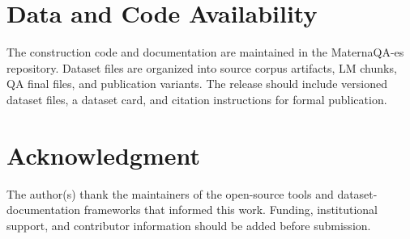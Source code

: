 \documentclass[conference]{IEEEtran}
\begin{document}
\section*{Data and Code Availability}
The construction code and documentation are maintained in the MaternaQA-es repository. Dataset files are organized into source corpus artifacts, LM chunks, QA final files, and publication variants. The release should include versioned dataset files, a dataset card, and citation instructions for formal publication.

\section*{Acknowledgment}
The author(s) thank the maintainers of the open-source tools and dataset-documentation frameworks that informed this work. Funding, institutional support, and contributor information should be added before submission.



\end{document}
